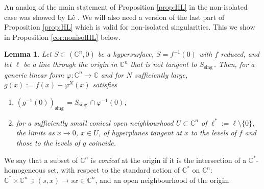 \documentclass[12pt]{amsart}
\newtheorem{lemma}[theorem]{Lemma}
\theoremstyle{definition}
\numberwithin{equation}{section}
\newcommand{\C}{\mathbb{C}}
\DeclareMathOperator{\sing}{sing \, }
\begin{document}
An analog of the main statement of Proposition \ref{prop:HL} in the non-isolated case was showed by  Lê  \cite{Le81}.  We will also need  a version of the last part of Proposition \ref{prop:HL} which is valid for non-isolated singularities.  This we show in Proposition \ref{cor:nonisolHL} below. 

 \begin{lemma}\label{lem:nonisolates}
Let $S\subset (\C^n,0)$ be a hypersurface, $S=f^{-1} (0)$ with $f$ reduced, and let $\ell$ be a line through the origin in $\C^n$ that is not tangent to $S_{\sing}$.  Then, for a generic linear form $\varphi: \C^ n\to \C$ and for $N$ sufficiently large,   
$g(x):= f(x) + \varphi^N(x)$ satisfies 
\begin{enumerate}[label=\roman*)] 
\item  
$(g^{-1} (0))_{\sing}= S_{\sing} \cap \varphi^{-1} (0)$; 
\item 
for a sufficiently small conical open neighbourhood $U\subset \C^n$ of $\ell^*:= \ell \setminus \{0\}$,  
the limits as $x\to 0$, $x\in U$,  of hyperplanes tangent at $x$ to the levels of $f$ and those to the levels of $g$  coincide.  
\end{enumerate}
 \end{lemma}

 We say  that a subset of $\C^n$ is \emph{conical} at the origin if it is the intersection of a $\C^*$-homogeneous set, with respect to  the standard action of $\C^*$ on $\C^n$: $\C^*\times \C^n \ni (s,x)\to sx \in \C^n $,  and an open neighbourhood of the origin. 
\end{document}
